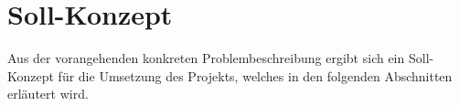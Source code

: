 
\section{Soll-Konzept}
\label{sec:soll-konzept}
Aus der vorangehenden konkreten Problembeschreibung ergibt sich ein Soll-Konzept für die Umsetzung des Projekts, welches in den folgenden Abschnitten erläutert wird.
